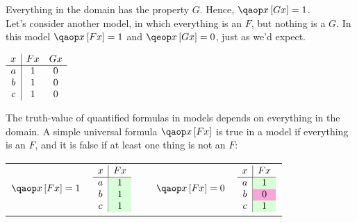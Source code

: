 \documentclass[PHIL101-Textbook.tex]{subfiles}
\begin{document}
 \noindent Everything in the domain has the property $G$. Hence, $\qab{x}{\atom G x} = \vT$.\\

 Let's consider another model, in which everything is an $F$, but nothing is a $G$. In this model $\qab{x}{\atom F x} = \vT$ and $\qeb{x}{\atom G x} =\vF$, just as we'd expect. 

\begin{center}
  $\begin{array}{c|cc}
	 x & \mathord{F}{x} & \mathord{G}{x}\\ \hline
	 a & 1 & 0\\
	 b & 1 & 0\\
	 c & 1 & 0			
   \end{array}$
 \end{center}

 \noindent 

The truth-value of quantified formulas in models depends on everything in the domain. A simple universal formula $\qab{x}{ \atom  F x}$ is true in a model if everything is an $F$, and it is false if at least one thing is not an $F$: 


 
 \begin{center}
   \begin{tabular}{cccc}
	$\qab{x}{\atom F x} = \vT$& 
	$\begin{array}{c|c}
	 x & \atom F x\\ \hline
	 a &\cellcolor{green!15} \vT \\
	 b & \cellcolor{green!15}\vT \\
	 c &\cellcolor{green!15} \vT		   
   \end{array}$ & $\ \ \ \ \qab{x}{\atom F x} = \vF$ &$\begin{array}{c|c}
	 x & \atom F x \\ \hline
	 a &\cellcolor{green!15} \vT \\
	 b & \cellcolor{magenta!35}\vF \\
	 c &\cellcolor{green!15} \vT		   
										   \end{array}$
		 \end{tabular}
	   \end{center}
\end{document}
